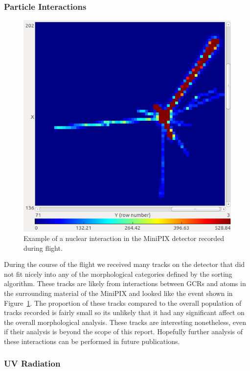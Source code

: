 \subsubsection{Particle Interactions}

\begin{figure}[H]
\begin{center}
\includegraphics[width=.5\textwidth]{./Figures/nuclear_interaction.png}
\caption{Example of a nuclear interaction in the MiniPIX detector recorded during flight.}
\label{fig:hits3}

\end{center}
\end{figure}

During the course of the flight we received many tracks on the detector that did not fit nicely into any of the morphological categories defined by the sorting algorithm. These tracks are likely from interactions between GCRs and atoms in the surrounding material of the MiniPIX and looked like the event shown in Figure~\ref{fig:hits3}. The proportion of these tracks compared to the overall population of tracks recorded is fairly small so its unlikely that it had any significant affect on the overall morphological analysis. These tracks are interesting nonetheless, even if their analysis is beyond the scope of this report. Hopefully further analysis of these interactions can be performed in future publications.

\subsubsection{UV Radiation}
\label{sec:UV-Radiation-Results}

